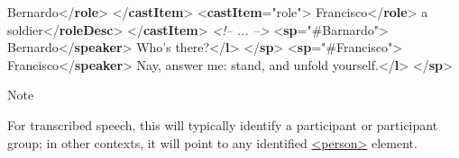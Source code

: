 \begin{reflist}
\begin{sansreflist}
\begin{reflist}
Bernardo{</\textbf{role}>}\mbox{}\newline 
{</\textbf{castItem}>}\mbox{}\newline 
{<\textbf{castItem}\hspace*{1em}{type}="{role}">}\mbox{}\newline 
{}Francisco{</\textbf{role}>}\mbox{}\newline 
{}a soldier{</\textbf{roleDesc}>}\mbox{}\newline 
{</\textbf{castItem}>}\mbox{}\newline 
\textit{<!-- ... -->}\mbox{}\newline 
{<\textbf{sp}\hspace*{1em}{who}="{\#Barnardo}">}\mbox{}\newline 
{}Bernardo{</\textbf{speaker}>}\mbox{}\newline 
{}Who's there?{</\textbf{l}>}\mbox{}\newline 
{</\textbf{sp}>}\mbox{}\newline 
{<\textbf{sp}\hspace*{1em}{who}="{\#Francisco}">}\mbox{}\newline 
{}Francisco{</\textbf{speaker}>}\mbox{}\newline 
{}Nay, answer me: stand, and unfold yourself.{</\textbf{l}>}\mbox{}\newline 
{</\textbf{sp}>}
    \item[{Note}]
  \par
For transcribed speech, this will typically identify a participant or participant group; in other contexts, it will point to any identified \hyperref[TEI.person]{<person>} element.
\end{reflist}  
\end{sansreflist}  
\end{reflist}  
